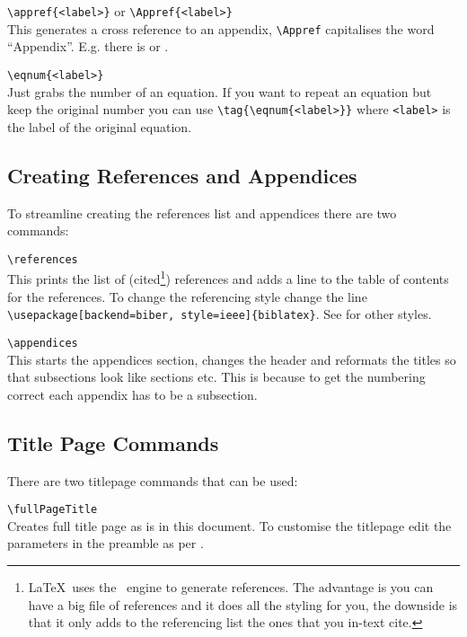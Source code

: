 \documentclass[a4paper, 12pt, english]{article}
\begin{document}
            \verb+\appref{<label>}+ or \verb+\Appref{<label>}+\\
            This generates a cross reference to an appendix, \verb+\Appref+ capitalises the word ``Appendix''. E.g. there is  or .

            \verb+\eqnum{<label>}+\\
            Just grabs the number of an equation. If you want to repeat an equation but keep the original number you can use \verb+\tag{\eqnum{<label>}}+ where \verb+<label>+ is the label of the original equation.

        \newpage

        \subsection{Creating References and Appendices}
            \label{subsec: creating references and appendices}

            To streamline creating the references list and appendices there are two commands:

            \verb+\references+\\
            This prints the list of (cited\footnote{\LaTeX~uses the \BibTeX~engine to generate references. The advantage is you can have a big file of references and it does all the styling for you, the downside is that it only adds to the referencing list the ones that you in-text cite.}) references and adds a line to the table of contents for the references. To change the referencing style change the line \\\verb+\usepackage[backend=biber, style=ieee]{biblatex}+. See \textcite{referencing-styles} for other styles.

            \verb+\appendices+\\
            This starts the appendices section, changes the header and reformats the titles so that subsections look like sections etc. This is because to get the numbering correct each appendix has to be a subsection.


        \subsection{Title Page Commands}
            \label{subsec: title page commands}

            There are two titlepage commands that can be used:

            \verb+\fullPageTitle+\\
            Creates full title page as is in this document. To customise the titlepage edit the parameters in the preamble as per .
\end{document}
